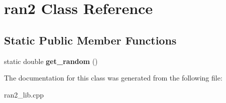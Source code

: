 \hypertarget{classran2}{}\section{ran2 Class Reference}
\label{classran2}
\subsection*{Static Public Member Functions}
\begin{DoxyCompactItemize}
\item 
\mbox{\label{classran2_a1774f26575de5341fe11d9e7af60c6b3}} 
static double {\bfseries get\+\_\+random} ()
\end{DoxyCompactItemize}


The documentation for this class was generated from the following file\+:\begin{DoxyCompactItemize}
\item 
ran2\+\_\+lib.\+cpp\end{DoxyCompactItemize}
